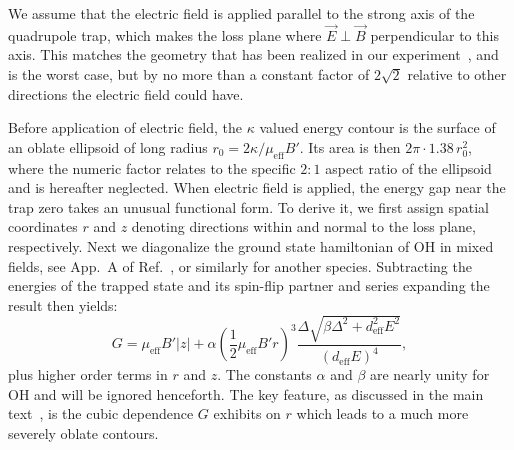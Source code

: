 \documentclass[%
 reprint,
 amsmath,amssymb,
 aps,
prl,
]{revtex4-1}
\begin{document}
We assume that the electric field is applied parallel to the strong axis of the quadrupole trap, which makes the loss plane where $\vec{E}\perp\vec{B}$ perpendicular to this axis. 
This matches the geometry that has been realized in our experiment~\cite{Stuhl2013}, and is the worst case, but by no more than a constant factor of $2\sqrt{2}$ relative to other directions the electric field could have.

Before application of electric field, the $\kappa$ valued energy contour is the surface of an oblate ellipsoid of long radius $r_0=2\kappa/\mu_\text{eff}B'$. 
Its area is then $2\pi\cdot1.38\,r_0^2$, where the numeric factor relates to the specific $2:1$ aspect ratio of the ellipsoid and is hereafter neglected.
When electric field is applied, the energy gap near the trap zero takes an unusual functional form.
To derive it, we first assign spatial coordinates $r$ and $z$ denoting directions within and normal to the loss plane, respectively.
Next we diagonalize the ground state hamiltonian of OH in mixed fields, see App.~A of Ref.~\cite{stuhl2012uwave}, or similarly for another species.
Subtracting the energies of the trapped state and its spin-flip partner and series expanding the result then yields:
\begin{equation}
\label{eqn:energy}
G = \mu_\text{eff}B'|z| + \alpha(\frac{1}{2}\mu_\text{eff}B'r)^3\frac{\Delta\sqrt{\beta\Delta^2\!+\!d_\text{eff}^2E^2}}{(d_\text{eff}E)^4},%
\end{equation}
plus higher order terms in $r$ and $z$. 
The constants $\alpha$ and $\beta$ are nearly unity for OH and will be ignored henceforth.
The key feature, as discussed in the main text~\cite{smt}, is the cubic dependence $G$ exhibits on $r$ which leads to a much more severely oblate contours.
\end{document}
